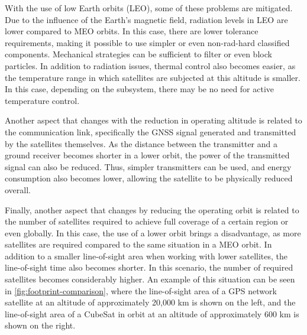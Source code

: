 With the use of low Earth orbits (LEO), some of these problems are mitigated. Due to the influence of the Earth's magnetic field, radiation levels in LEO are lower compared to MEO orbits. In this case, there are lower tolerance requirements, making it possible to use simpler or even non-rad-hard classified components. Mechanical strategies can be sufficient to filter or even block particles. In addition to radiation issues, thermal control also becomes easier, as the temperature range in which satellites are subjected at this altitude is smaller. In this case, depending on the subsystem, there may be no need for active temperature control.

Another aspect that changes with the reduction in operating altitude is related to the communication link, specifically the GNSS signal generated and transmitted by the satellites themselves. As the distance between the transmitter and a ground receiver becomes shorter in a lower orbit, the power of the transmitted signal can also be reduced. Thus, simpler transmitters can be used, and energy consumption also becomes lower, allowing the satellite to be physically reduced overall.

Finally, another aspect that changes by reducing the operating orbit is related to the number of satellites required to achieve full coverage of a certain region or even globally. In this case, the use of a lower orbit brings a disadvantage, as more satellites are required compared to the same situation in a MEO orbit. In addition to a smaller line-of-sight area when working with lower satellites, the line-of-sight time also becomes shorter. In this scenario, the number of required satellites becomes considerably higher. An example of this situation can be seen in \autoref{fig:footprint-comparison}, where the line-of-sight area of a GPS network satellite at an altitude of approximately 20,000 km is shown on the left, and the line-of-sight area of a CubeSat in orbit at an altitude of approximately 600 km is shown on the right.


